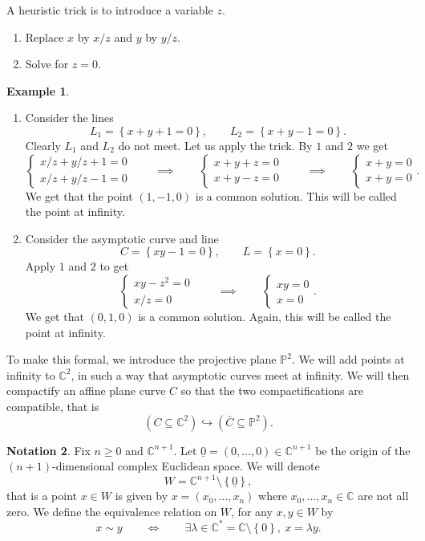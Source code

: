 \documentclass{article}
\newcommand{\C}{\mathbb{C}}
\renewcommand{\P}{\mathbb{P}}
\newcommand{\rb}[1]{\left( #1 \right)}
\newcommand{\cb}[1]{\left\{ #1 \right\}}
\theoremstyle{definition}\newtheorem{definition}{Definition}[section]
\theoremstyle{definition}\newtheorem{notation}[definition]{Notation}
\theoremstyle{definition}\newtheorem{remark}[definition]{Remark}
\theoremstyle{definition}\newtheorem{example}[definition]{Example}
\theoremstyle{definition}\newtheorem{fact}{Fact}
\theoremstyle{definition}\newtheorem{exercise}{Exercise}
\begin{document}
A heuristic trick is to introduce a variable $ z $.
\begin{enumerate}
\item Replace $ x $ by $ x / z $ and $ y $ by $ y / z $.
\item Solve for $ z = 0 $.
\end{enumerate}

\begin{example}
\hfill
\begin{enumerate}
\item Consider the lines
$$ L_1 = \cb{x + y + 1 = 0}, \qquad L_2 = \cb{x + y - 1 = 0}. $$
Clearly $ L_1 $ and $ L_2 $ do not meet. Let us apply the trick. By $ 1 $ and $ 2 $ we get
$$ \begin{cases} x / z + y / z + 1 = 0 \\ x / z + y / z - 1 = 0 \end{cases} \qquad \implies \qquad \begin{cases} x + y + z = 0 \\ x + y - z = 0 \end{cases} \qquad \implies \qquad \begin{cases} x + y = 0 \\ x + y = 0 \end{cases}. $$
We get that the point $ \rb{1, -1, 0} $ is a common solution. This will be called the point at infinity.
\item Consider the asymptotic curve and line
$$ C = \cb{xy - 1 = 0}, \qquad L = \cb{x = 0}. $$
Apply $ 1 $ and $ 2 $ to get
$$ \begin{cases} xy - z^2 = 0 \\ x / z = 0 \end{cases} \qquad \implies \qquad \begin{cases} xy = 0 \\ x = 0 \end{cases}. $$
We get that $ \rb{0, 1, 0} $ is a common solution. Again, this will be called the point at infinity.
\end{enumerate}
\end{example}

To make this formal, we introduce the projective plane $ \P^2 $. We will add points at infinity to $ \C^2 $, in such a way that asymptotic curves meet at infinity. We will then compactify an affine plane curve $ C $ so that the two compactifications are compatible, that is
$$ \rb{C \subseteq \C^2} \hookrightarrow \rb{\bar{C} \subseteq \P^2}. $$

\begin{notation}
Fix $ n \ge 0 $ and $ \C^{n + 1} $. Let $ \underline{0} = \rb{0, \dots, 0} \in \C^{n + 1} $ be the origin of the $ \rb{n + 1} $-dimensional complex Euclidean space. We will denote
$$ W = \C^{n + 1} \setminus \cb{\underline{0}}, $$
that is a point $ x \in W $ is given by $ x = \rb{x_0, \dots, x_n} $ where $ x_0, \dots, x_n \in \C $ are not all zero. We define the equivalence relation on $ W $, for any $ x, y \in W $ by
$$ x \sim y \qquad \iff \qquad \exists \lambda \in \C^* = \C \setminus \cb{0}, \ x = \lambda y. $$
\end{notation}
\end{document}
